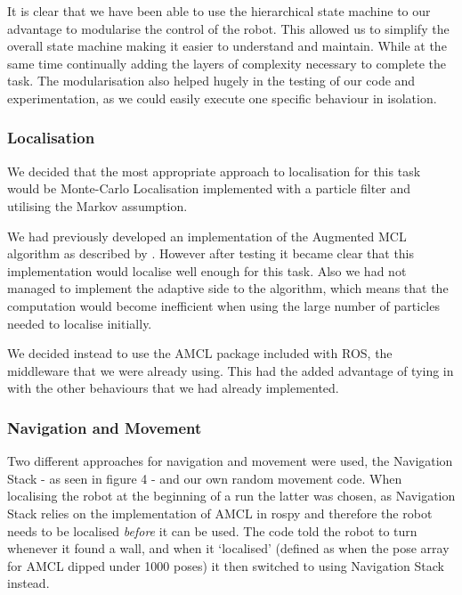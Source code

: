 It is clear that we have been able to use the hierarchical state machine to our advantage to modularise the control of the robot. This allowed us to simplify the overall state machine making it easier to understand and maintain. While at the same time continually adding the layers of complexity necessary to complete the task. The modularisation also helped hugely in the testing of our code and experimentation, as we could easily execute one specific behaviour in isolation.

\subsubsection{Localisation}

We decided that the most appropriate approach to localisation for this task would be Monte-Carlo Localisation implemented with a particle filter and utilising the Markov assumption.

We had previously developed an implementation of the Augmented MCL algorithm as described by \cite{Thrun:2005:PR:1121596}. However after testing it became clear that this implementation would localise well enough for this task. Also we had not managed to implement the adaptive side to the algorithm, which means that the computation would become inefficient when using the large number of particles needed to localise initially.

We decided instead to use the AMCL package included with ROS, the middleware that we were already using. This had the added advantage of tying in with the other behaviours that we had already implemented.

\subsubsection{Navigation and Movement}

Two different approaches for navigation and movement were used, the Navigation Stack - as seen in figure 4 - and our own random movement code. When localising the robot at the beginning of a run the latter was chosen, as Navigation Stack relies on the implementation of AMCL in rospy and therefore the robot needs to be localised \textit{before} it can be used. The code told the robot to turn whenever it found a wall, and when it `localised' (defined as when the pose array for AMCL dipped under 1000 poses) it then switched to using Navigation Stack instead.


